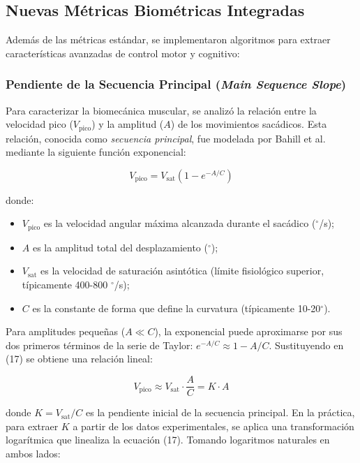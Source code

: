 \subsection{Nuevas Métricas Biométricas Integradas}

Además de las métricas estándar, se implementaron algoritmos para extraer características avanzadas de control motor y cognitivo:

\subsubsection{Pendiente de la Secuencia Principal (\textit{Main Sequence Slope})}

Para caracterizar la biomecánica muscular, se analizó la relación entre la velocidad pico ($V_{\text{pico}}$) y la amplitud ($A$) de los movimientos sacádicos. Esta relación, conocida como \textit{secuencia principal}, fue modelada por Bahill et al. \cite{bahill1975} mediante la siguiente función exponencial:

\begin{equation}
	V_{\text{pico}} = V_{\text{sat}} \left(1 - e^{-A / C}\right) \tag{17}
\end{equation}

donde:
\begin{itemize}
	\item $V_{\text{pico}}$ es la velocidad angular máxima alcanzada durante el sacádico ($^\circ$/s);
	\item $A$ es la amplitud total del desplazamiento ($^\circ$);
	\item $V_{\text{sat}}$ es la velocidad de saturación asintótica (límite fisiológico superior, típicamente 400-800 $^\circ$/s);
	\item $C$ es la constante de forma que define la curvatura (típicamente 10-20$^\circ$).
\end{itemize}

Para amplitudes pequeñas ($A \ll C$), la exponencial puede aproximarse por sus dos primeros términos de la serie de Taylor: $e^{-A/C} \approx 1 - A/C$. Sustituyendo en (17) se obtiene una relación lineal:

\begin{equation}
	V_{\text{pico}} \approx V_{\text{sat}} \cdot \frac{A}{C} = K \cdot A \tag{18}
\end{equation}

donde $K = V_{\text{sat}} / C$ es la pendiente inicial de la secuencia principal. En la práctica, para extraer $K$ a partir de los datos experimentales, se aplica una transformación logarítmica que linealiza la ecuación (17). Tomando logaritmos naturales en ambos lados:

